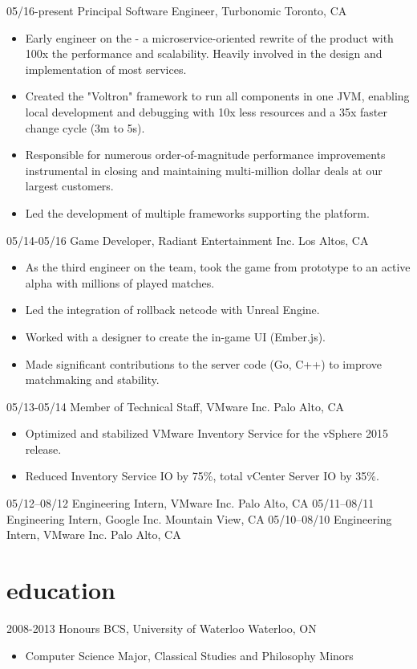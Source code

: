 \documentclass[]{zimine-cv}
\begin{document}
\begin{entrylist}
  \entry
    {05/16-present}
    {Principal Software Engineer, Turbonomic}
    {Toronto, CA}
    {\begin{itemize}
      \item Early engineer on the  - a microservice-oriented rewrite of the product with 100x the performance and scalability. Heavily involved in the design and implementation of most services.
      \item Created the "Voltron" framework to run all components in one JVM, enabling local development and debugging with 10x less resources and a 35x faster change cycle (3m to 5s).
      \item Responsible for numerous order-of-magnitude performance improvements instrumental in closing and maintaining multi-million dollar deals at our largest customers.
      \item Led the development of multiple frameworks supporting the platform.
    \end{itemize}}
  \entry
    {05/14-05/16}
    {Game Developer, Radiant Entertainment Inc.}
    {Los Altos, CA}
    {\begin{itemize}
      \item As the third engineer on the  team, took the game from prototype to an active alpha with millions of played matches.
      \item Led the integration of rollback netcode with Unreal Engine.
      \item Worked with a designer to create the in-game UI (Ember.js).
      \item Made significant contributions to the server code (Go, C++) to improve matchmaking and stability.
    \end{itemize}}
  \entry
    {05/13-05/14}
    {Member of Technical Staff, VMware Inc.}
    {Palo Alto, CA}
    {\begin{itemize}
      \item Optimized and stabilized VMware Inventory Service for the vSphere 2015 release.
      \item Reduced Inventory Service IO by 75\%, total vCenter Server IO by 35\%.
    \end{itemize}}
  \entry
    {05/12–08/12}
    {Engineering Intern, VMware Inc.}
    {Palo Alto, CA}
   \entry
    {05/11–08/11}
    {Engineering Intern, Google Inc.}
    {Mountain View, CA}
  \entry
    {05/10–08/10}
    {Engineering Intern, VMware Inc.}
    {Palo Alto, CA}
\end{entrylist}

\section{education}

\begin{entrylist}
  \entry
    {2008-2013}
    {Honours BCS, University of Waterloo}
    {Waterloo, ON}
    {\begin{itemize}
       \item Computer Science Major, Classical Studies and Philosophy Minors
    \end{itemize}}
\end{entrylist}
\end{document}
